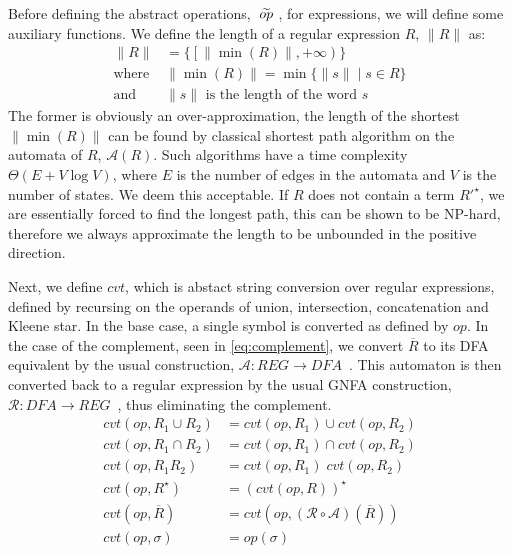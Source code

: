 Before defining the abstract operations, $\;\widetilde{op}\;$, for expressions, we will define some auxiliary functions.
We define the length of a regular expression $R$, $\|R\|$ as:
\begin{align}\label{eq:r1}
    \|R\| & = \{ \left[ \|\min(R)\|, +\infty \right) \} \\
    \text{where } & \|\min(R)\| = \min\{ \|s\| \mid s \in R \} \\ \label{eq:r2}
    \text{and } & \|s\| \text{ is the length of the word $s$}
\end{align}
The former is obviously an over-approximation, the length of the shortest $\|\min(R)\|$ can be found by classical shortest path algorithm on the automata of $R$, $\mathcal{A}(R)$.
Such algorithms have a time complexity $\Theta(E + V \log V)$, where $E$ is the number of edges in the automata and $V$ is the number of states.
We deem this acceptable.
If $R$ does not contain a term $R'^\star$, we are essentially forced to find the longest path, this can be shown to be NP-hard, therefore we always approximate the length to be unbounded in the positive direction.

Next, we define $cvt$, which is abstact string conversion over regular expressions, defined by recursing on the operands of union, intersection, concatenation and Kleene star.
In the base case, a single symbol is converted as defined by $op$.
In the case of the complement, seen in \autoref{eq:complement}, we convert $\overline{R}$ to its DFA equivalent by the usual construction, $\mathcal{A}:REG\rightarrow DFA$~\cite{sipserbook}.
This automaton is then converted back to a regular expression by the usual GNFA construction, $\mathcal{R}: DFA\rightarrow REG$~\cite{sipserbook}, thus eliminating the complement.
\begin{align}
    cvt(op, R_1 \cup R_2) &= cvt(op, R_1) \cup cvt(op, R_2) \\
    cvt(op, R_1 \cap R_2) &= cvt(op, R_1) \cap cvt(op, R_2) \\
    cvt(op, R_1R_2) &= cvt(op, R_1) \; cvt(op, R_2) \\
    cvt(op, R^\star) &= (cvt(op, R))^\star \\
    cvt(op, \overline{R}) &= cvt(op, (\mathcal{R} \circ \mathcal{A}) (\overline{R})) \label{eq:complement} \\
    cvt(op, \sigma) &= op(\sigma)
\end{align}

